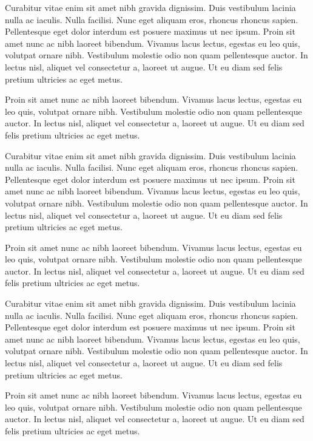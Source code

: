 Curabitur vitae enim sit amet nibh gravida dignissim. Duis vestibulum lacinia nulla ac iaculis. Nulla facilisi. Nunc eget aliquam eros, rhoncus rhoncus sapien. Pellentesque eget dolor interdum est posuere maximus ut nec ipsum. Proin sit amet nunc ac nibh laoreet bibendum. Vivamus lacus lectus, egestas eu leo quis, volutpat ornare nibh. Vestibulum molestie odio non quam pellentesque auctor. In lectus nisl, aliquet vel consectetur a, laoreet ut augue. Ut eu diam sed felis pretium ultricies ac eget metus.

Proin sit amet nunc ac nibh laoreet bibendum. Vivamus lacus lectus, egestas eu leo quis, volutpat ornare nibh. Vestibulum molestie odio non quam pellentesque auctor. In lectus nisl, aliquet vel consectetur a, laoreet ut augue. Ut eu diam sed felis pretium ultricies ac eget metus.


Curabitur vitae enim sit amet nibh gravida dignissim. Duis vestibulum lacinia nulla ac iaculis. Nulla facilisi. Nunc eget aliquam eros, rhoncus rhoncus sapien. Pellentesque eget dolor interdum est posuere maximus ut nec ipsum. Proin sit amet nunc ac nibh laoreet bibendum. Vivamus lacus lectus, egestas eu leo quis, volutpat ornare nibh. Vestibulum molestie odio non quam pellentesque auctor. In lectus nisl, aliquet vel consectetur a, laoreet ut augue. Ut eu diam sed felis pretium ultricies ac eget metus.

Proin sit amet nunc ac nibh laoreet bibendum. Vivamus lacus lectus, egestas eu leo quis, volutpat ornare nibh. Vestibulum molestie odio non quam pellentesque auctor. In lectus nisl, aliquet vel consectetur a, laoreet ut augue. Ut eu diam sed felis pretium ultricies ac eget metus.


Curabitur vitae enim sit amet nibh gravida dignissim. Duis vestibulum lacinia nulla ac iaculis. Nulla facilisi. Nunc eget aliquam eros, rhoncus rhoncus sapien. Pellentesque eget dolor interdum est posuere maximus ut nec ipsum. Proin sit amet nunc ac nibh laoreet bibendum. Vivamus lacus lectus, egestas eu leo quis, volutpat ornare nibh. Vestibulum molestie odio non quam pellentesque auctor. In lectus nisl, aliquet vel consectetur a, laoreet ut augue. Ut eu diam sed felis pretium ultricies ac eget metus.

Proin sit amet nunc ac nibh laoreet bibendum. Vivamus lacus lectus, egestas eu leo quis, volutpat ornare nibh. Vestibulum molestie odio non quam pellentesque auctor. In lectus nisl, aliquet vel consectetur a, laoreet ut augue. Ut eu diam sed felis pretium ultricies ac eget metus.
 


